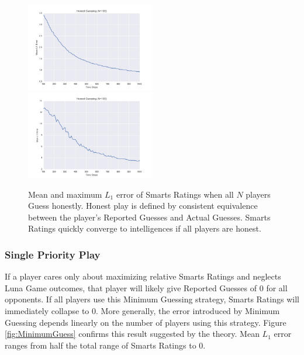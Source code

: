 \begin{figure}[h]
\centerline{%
\includegraphics[width=0.5\textwidth]{figures/robustness/Honest_Guessing21.png}%
\includegraphics[width=0.5\textwidth] {figures/robustness/Honest_Guessing22.png}%
}%
\caption{Mean and maximum $L_1$ error of Smarts Ratings when all $N$ players Guess honestly. Honest play is defined by consistent equivalence between the player's Reported Guesses and Actual Guesses. Smarts Ratings quickly converge to intelligences if all players are honest.}
\label{fig:HonestGuess}
\end{figure}

\subsubsection{Single Priority Play}

If a player cares only about maximizing relative Smarts Ratings and neglects Luna Game outcomes, that player will likely give Reported Guesses of $0$ for all opponents. If all players use this Minimum Guessing strategy, Smarts Ratings will immediately collapse to $0$. More generally, the error introduced by Minimum Guessing depends linearly on the number of players using this strategy. Figure \ref{fig:MinimumGuess} confirms this result suggested by the theory. Mean $L_1$ error ranges from half the total range of Smarts Ratings to $0$.

